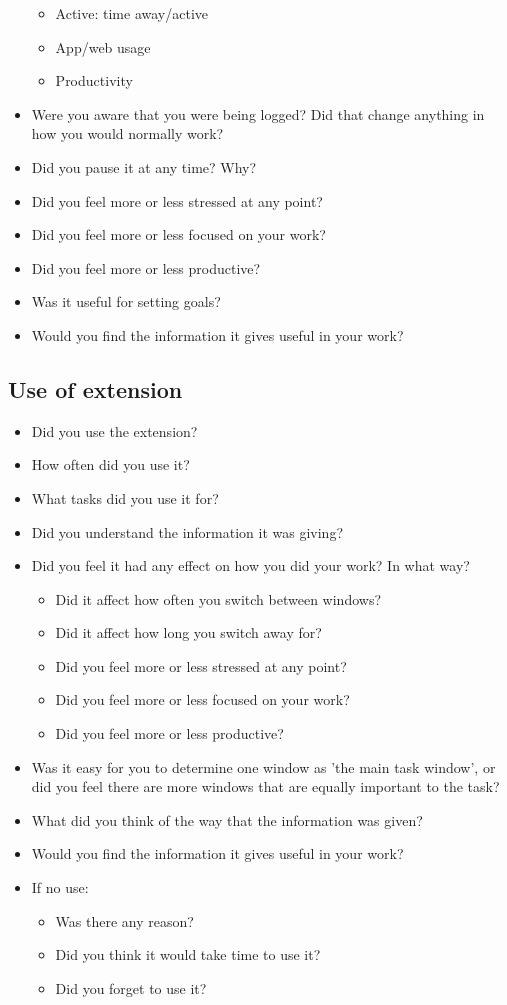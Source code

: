 \begin{itemize}
\begin{itemize}
\item Active: time away/active
\item App/web usage
\item Productivity
\end{itemize}
\item Were you aware that you were being logged? Did that change anything in how you would normally work?
\item Did you pause it at any time? Why?
\item Did you feel more or less stressed at any point? 
\item Did you feel more or less focused on your work? 
\item Did you feel more or less productive?
\item Was it useful for setting goals?
\item Would you find the information it gives useful in your work? 
 \end{itemize}

\subsection{Use of extension}
\begin{itemize}
\item Did you use the extension?
\item How often did you use it?
\item What tasks did you use it for?
\item Did you understand the information it was giving?
\item Did you feel it had any effect on how you did your work? In what way?
\begin{itemize}
\item Did it affect how often you switch between windows?
\item Did it affect how long you switch away for?
\item Did you feel more or less stressed at any point? 
\item Did you feel more or less focused on your work? 
\item Did you feel more or less productive?
\end{itemize}
\item Was it easy for you to determine one window as 'the main task window', or did you feel there are more windows that are equally important to the task?
\item What did you think of the way that the information was given?
\item Would you find the information it gives useful in your work?
\item If no use:
\begin{itemize}
\item Was there any reason?
\item Did you think it would take time to use it?
\item Did you forget to use it?
\end{itemize}
\end{itemize}

